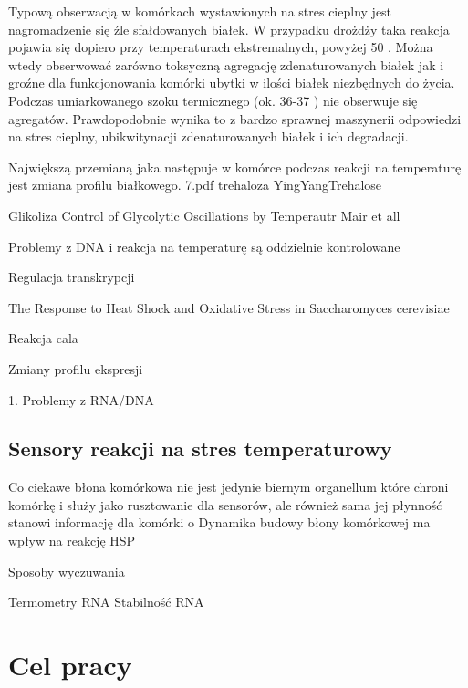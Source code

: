 \documentclass{pracamgr}
\begin{document}
 Typową obserwacją w komórkach wystawionych na stres cieplny jest nagromadzenie się źle sfałdowanych białek. 
 W przypadku drożdży taka reakcja pojawia się dopiero przy temperaturach ekstremalnych, powyżej 50 \textcelsius. Można
 wtedy obserwować zarówno toksyczną agregację zdenaturowanych białek jak i groźne dla funkcjonowania komórki ubytki w 
 ilości białek niezbędnych do życia. Podczas umiarkowanego szoku termicznego (ok. 36-37 \textcelsius) nie obserwuje się
 agregatów. Prawdopodobnie wynika to z bardzo sprawnej maszynerii odpowiedzi na stres cieplny, ubikwitynacji zdenaturowanych
 białek i ich degradacji\cite{Bible}.
 
 Największą przemianą jaka następuje w komórce podczas reakcji na temperaturę jest zmiana profilu białkowego.  7.pdf
 trehaloza YingYangTrehalose
 
 Glikoliza Control of Glycolytic Oscillations by Temperautr Mair et all
 
Problemy z DNA i reakcja na temperaturę są oddzielnie kontrolowane \cite{Duallyregulated85}

Regulacja transkrypcji \cite{Yamamoto08}

The Response to Heat Shock and Oxidative Stress
in Saccharomyces cerevisiae \cite{Morano12}

Reakcja cala \cite{Bible}
 

Zmiany profilu ekspresji \cite{Gash00}

1. Problemy z RNA/DNA


\section{Sensory reakcji na stres temperaturowy}

 Co ciekawe błona komórkowa nie jest jedynie biernym organellum które chroni
 komórkę i służy jako rusztowanie dla sensorów, ale również sama jej płynność stanowi informację dla komórki o 
 Dynamika budowy błony komórkowej ma wpływ na reakcję HSP\cite{Carratu96}
 
 Sposoby wyczuwania \cite{SensingLesson}

Termometry RNA \cite{RNAterm}
Stabilność RNA \cite{Roca11}

 




\chapter{Cel pracy}
\end{document}
